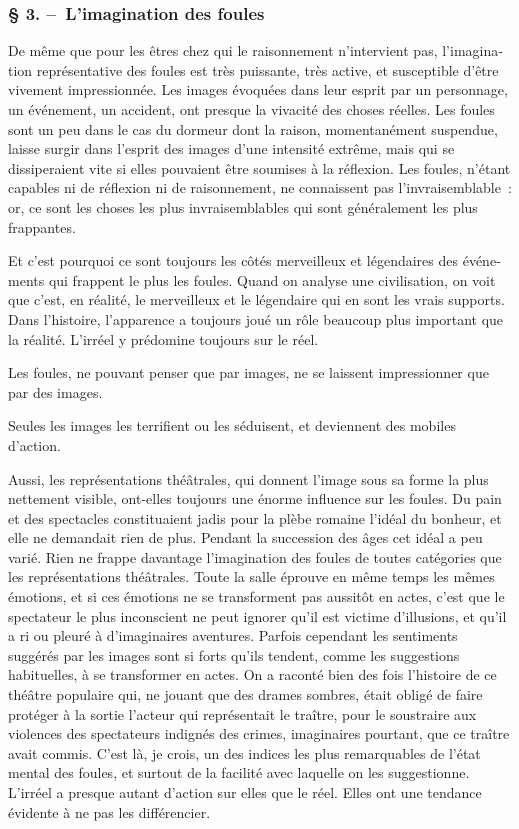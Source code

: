 \documentclass[french,twoside]{book} %
\begin{document}
\subsubsection[{§ 3. – L’imagination des foules}]{§ 3. – L’imagination des foules}
\noindent De même que pour les êtres chez qui le raisonnement n’intervient pas, l’imagina­tion représentative des foules est très puissante, très active, et susceptible d’être vive­ment impressionnée. Les images évoquées dans leur esprit par un personnage, un événement, un accident, ont presque la vivacité des choses réelles. Les foules sont un peu dans le cas du dormeur dont la raison, momentanément suspendue, laisse surgir dans l’esprit des images d’une intensité extrême, mais qui se dissiperaient vite si elles pouvaient être soumises à la réflexion. Les foules, n’étant capables ni de réflexion ni de raisonnement, ne connaissent pas l’invraisemblable : or, ce sont les choses les plus invraisemblables qui sont généralement les plus frappantes.\par
Et c’est pourquoi ce sont toujours les côtés merveilleux et légendaires des événe­ments qui frappent le plus les foules. Quand on analyse une civilisation, on voit que c’est, en réalité, le merveilleux et le légendaire qui en sont les vrais supports. Dans l’histoire, l’apparence a toujours joué un rôle beaucoup plus important que la réalité. L’irréel y prédomine toujours sur le réel.\par
Les foules, ne pouvant penser que par images, ne se laissent impressionner que par des images.\par
Seules les images les terrifient ou les séduisent, et deviennent des mobiles d’action.\par
Aussi, les représentations théâtrales, qui donnent l’image sous sa forme la plus nettement visible, ont-elles toujours une énorme influence sur les foules. Du pain et des spectacles constituaient jadis pour la plèbe romaine l’idéal du bonheur, et elle ne demandait rien de plus. Pendant la succession des âges cet idéal a peu varié. Rien ne frappe davantage l’imagination des foules de toutes catégories que les représentations théâtrales. Toute la salle éprouve en même temps les mêmes émotions, et si ces émotions ne se transforment pas aussitôt en actes, c’est que le spectateur le plus inconscient ne peut ignorer qu’il est victime d’illusions, et qu’il a ri ou pleuré à d’ima­ginaires aventures. Parfois cependant les sentiments suggérés par les images sont si forts qu’ils tendent, comme les suggestions habituelles, à se transformer en actes. On a raconté bien des fois l’histoire de ce théâtre populaire qui, ne jouant que des drames sombres, était obligé de faire protéger à la sortie l’acteur qui représentait le traître, pour le soustraire aux violences des spectateurs indignés des crimes, imaginaires pourtant, que ce traître avait commis. C’est là, je crois, un des indices les plus remar­quables de l’état mental des foules, et surtout de la facilité avec laquelle on les suggestionne. L’irréel a presque autant d’action sur elles que le réel. Elles ont une tendance évidente à ne pas les différencier.\par
\end{document}
